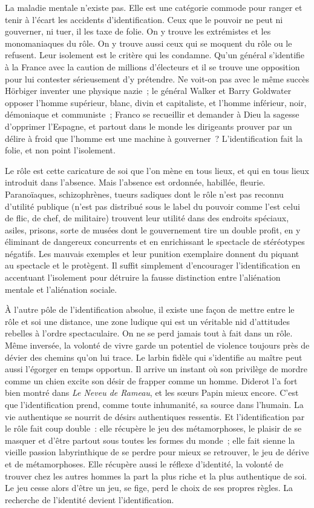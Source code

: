 \documentclass[french,twoside]{book} %
\newcommand{\astermono}{\medskip\centerline{\color{rubric}\large\selectfont{\syms ✻}}\medskip\par}%
\begin{document}
\astermono

\noindent La maladie mentale n’existe pas. Elle est une catégorie commode pour ranger et tenir à l’écart les accidents d’identification. Ceux que le pouvoir ne peut ni gouverner, ni tuer, il les taxe de folie. On y trouve les extrémistes et les monomaniaques du rôle. On y trouve aussi ceux qui se moquent du rôle ou le refusent. Leur isolement est le critère qui les condamne. Qu’un général s’identifie à la France avec la caution de millions d’électeurs et il se trouve une opposition pour lui contester sérieusement d’y prétendre. Ne voit-on pas avec le même succès Hörbiger inventer une physique nazie ; le général Walker et Barry Goldwater opposer l’homme supérieur, blanc, divin et capitaliste, et l’homme inférieur, noir, démoniaque et communiste ; Franco se recueillir et demander à Dieu la sagesse d’opprimer l’Espagne, et partout dans le monde les dirigeants prouver par un délire à froid que l’homme est une machine à gouverner ? L’identification fait la folie, et non point l’isolement.\par
Le rôle est cette caricature de soi que l’on mène en tous lieux, et qui en tous lieux introduit dans l’absence. Mais l’absence est ordonnée, habillée, fleurie. Paranoïaques, schizophrènes, tueurs sadiques dont le rôle n’est pas reconnu d’utilité publique (n’est pas distribué sous le label du pouvoir comme l’est celui de flic, de chef, de militaire) trouvent leur utilité dans des endroits spéciaux, asiles, prisons, sorte de musées dont le gouvernement tire un double profit, en y éliminant de dangereux concurrents et en enrichissant le spectacle de stéréotypes négatifs. Les mauvais exemples et leur punition exemplaire donnent du piquant au spectacle et le protègent. Il suffit simplement d’encourager l’identification en accentuant l’isolement pour détruire la fausse distinction entre l’aliénation mentale et l’aliénation sociale.\par
À l’autre pôle de l’identification absolue, il existe une façon de mettre entre le rôle et soi une distance, une zone ludique qui est un véritable nid d’attitudes rebelles à l’ordre spectaculaire. On ne se perd jamais tout à fait dans un rôle. Même inversée, la volonté de vivre garde un potentiel de violence toujours près de dévier des chemins qu’on lui trace. Le larbin fidèle qui s’identifie au maître peut aussi l’égorger en temps opportun. Il arrive un instant où son privilège de mordre comme un chien excite son désir de frapper comme un homme. Diderot l’a fort bien montré dans \emph{Le Neveu de Rameau}, et les sœurs Papin mieux encore. C’est que l’identification prend, comme toute inhumanité, sa source dans l’humain. La vie authentique se nourrit de désirs authentiques ressentis. Et l’identification par le rôle fait coup double : elle récupère le jeu des métamorphoses, le plaisir de se masquer et d’être partout sous toutes les formes du monde ; elle fait sienne la vieille passion labyrinthique de se perdre pour mieux se retrouver, le jeu de dérive et de métamorphoses. Elle récupère aussi le réflexe d’identité, la volonté de trouver chez les autres hommes la part la plus riche et la plus authentique de soi. Le jeu cesse alors d’être un jeu, se fige, perd le choix de ses propres règles. La recherche de l’identité devient l’identification.\par
\end{document}
